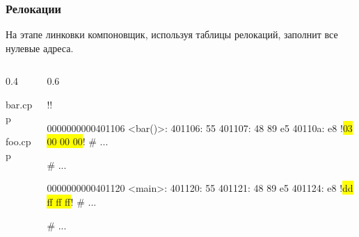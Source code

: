 \documentclass[compress, 10pt, aspectratio=169]{beamer}
\begin{document}
\begin{frame}[fragile]

    \frametitle{Релокации}

    На этапе линковки компоновщик, используя таблицы релокаций, заполнит
    все нулевые адреса.

    \begin{columns}[T]

        \begin{column}{0.4\textwidth}

                {bar.cpp}

                {foo.cpp}

        \end{column}

        \begin{column}{0.6\textwidth}

            \begin{terminalwindow}
!!

0000000000401106 <bar()>:
  401106:       55
  401107:       48 89 e5
  40110a:       e8 !\colorbox{yellow}{03 00 00 00}!
  # ...

# ...

0000000000401120 <main>:
  401120:       55
  401121:       48 89 e5
  401124:       e8 !\colorbox{yellow}{dd ff ff ff}!
  # ...

# ...
            \end{terminalwindow}

        \end{column}

    \end{columns}

\end{frame}
\end{document}
